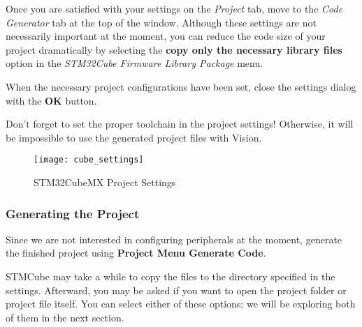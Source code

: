 \documentclass[11pt,fleqn]{book} %
\begin{document}
Once you are satisfied with your settings on the \textit{Project} tab, move to the \textit{Code Generator} tab at the top of the window. Although these settings are not necessarily important at the moment, you can reduce the code size of your project dramatically by selecting the \textbf{copy only the necessary library files} option in the \textit{STM32Cube Firmware Library Package} menu.
 
When the necessary project configurations have been set, close the settings dialog with the \textbf{OK} button. 

\begin{warning}
	Don't forget to set the proper toolchain in the project settings! Otherwise, it will be impossible to use the generated project files with {\textmu}Vision.
\end{warning}

\begin{figure}[h!]
	\centering\texttt{[image: cube\_settings]}
	\caption{STM32CubeMX Project Settings}
	\label{cube_settings}
\end{figure}

\subsubsection*{Generating the Project}
Since we are not interested in configuring peripherals at the moment, generate the finished project using \textbf{Project Menu \textrightarrow Generate Code}. 

STMCube may take a while to copy the files to the directory specified in the settings. Afterward, you may be asked if you want to open the project folder or project file itself. You can select either of these options; we will be exploring both of them in the next section. %
\end{document}
